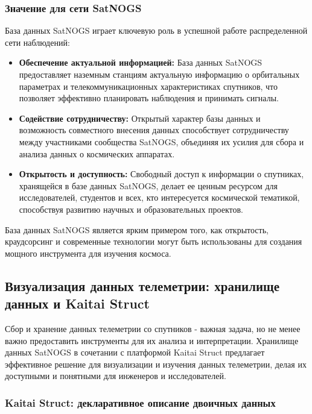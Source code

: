 \documentclass[14pt, a4paper]{extreport}
\begin{document}
    \subsubsection{Значение для сети SatNOGS}

    База данных SatNOGS играет ключевую роль в успешной работе распределенной сети наблюдений:

    \begin{itemize}
        \item \textbf{Обеспечение актуальной информацией:} База данных SatNOGS предоставляет наземным станциям актуальную информацию о орбитальных параметрах и телекоммуникационных характеристиках спутников, что позволяет эффективно планировать наблюдения и принимать сигналы.
        \item \textbf{Содействие сотрудничеству:} Открытый характер базы данных и возможность совместного внесения данных способствует сотрудничеству между участниками сообщества SatNOGS, объединяя их усилия для сбора и анализа данных о космических аппаратах.
        \item \textbf{Открытость и доступность:} Свободный доступ к информации о спутниках, хранящейся в базе данных SatNOGS, делает ее ценным ресурсом для исследователей, студентов и всех, кто интересуется космической тематикой, способствуя развитию научных и образовательных проектов.
    \end{itemize}

    База данных SatNOGS является ярким примером того, как открытость, краудсорсинг и современные технологии могут быть использованы для создания мощного инструмента для изучения космоса.

    \subsection{Визуализация данных телеметрии: хранилище данных и Kaitai Struct}

    Сбор и хранение данных телеметрии со спутников - важная задача, но не менее важно предоставить инструменты для их анализа и интерпретации.
    Хранилище данных SatNOGS в сочетании с платформой Kaitai Struct предлагает эффективное решение для визуализации и изучения данных телеметрии, делая их доступными и понятными для инженеров и исследователей.

    \subsubsection{Kaitai Struct: декларативное описание двоичных данных}
\end{document}
